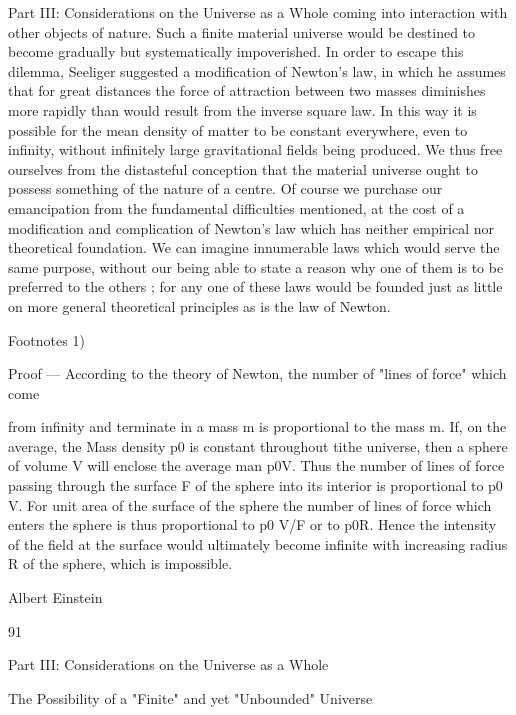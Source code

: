 \documentclass{article}
\begin{document}
Part III: Considerations on the Universe as a Whole
coming into interaction with other objects of nature. Such a finite material universe would
be destined to become gradually but systematically impoverished.
In order to escape this dilemma, Seeliger suggested a modification of Newton's law, in
which he assumes that for great distances the force of attraction between two masses
diminishes more rapidly than would result from the inverse square law. In this way it is
possible for the mean density of matter to be constant everywhere, even to infinity, without
infinitely large gravitational fields being produced. We thus free ourselves from the
distasteful conception that the material universe ought to possess something of the nature of
a centre. Of course we purchase our emancipation from the fundamental difficulties
mentioned, at the cost of a modification and complication of Newton's law which has
neither empirical nor theoretical foundation. We can imagine innumerable laws which
would serve the same purpose, without our being able to state a reason why one of them is
to be preferred to the others ; for any one of these laws would be founded just as little on
more general theoretical principles as is the law of Newton.

Footnotes
1)

Proof — According to the theory of Newton, the number of "lines of force" which come

from infinity and terminate in a mass m is proportional to the mass m. If, on the average, the
Mass density p0 is constant throughout tithe universe, then a sphere of volume V will
enclose the average man p0V. Thus the number of lines of force passing through the surface
F of the sphere into its interior is proportional to p0 V. For unit area of the surface of the
sphere the number of lines of force which enters the sphere is thus proportional to p0 V/F or
to p0R. Hence the intensity of the field at the surface would ultimately become infinite with
increasing radius R of the sphere, which is impossible.

Albert Einstein

91

Part III: Considerations on the Universe as a Whole

The Possibility of a "Finite" and
yet "Unbounded" Universe
\end{document}
